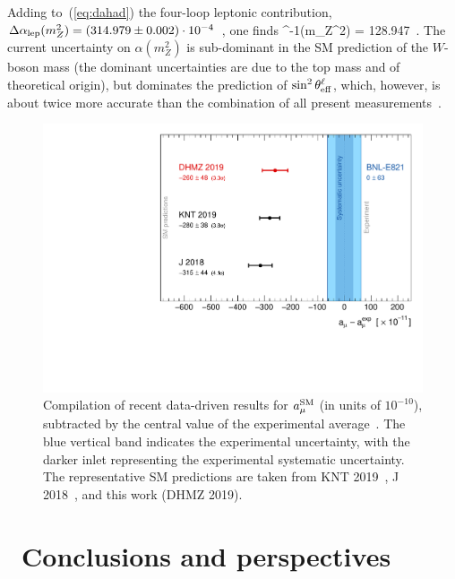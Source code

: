 Adding to~(\ref{eq:dahad}) the four-loop leptonic contribution, $\Delta\alpha_{\rm lep} (m_Z^2)=(314.979 \pm 0.002)\cdot 10^{-4}$~\cite{sturm}, 
one finds
\beq
   \alpha^{-1}(m_Z^2) = 128.947 \,.
\eeq
The current uncertainty on $ \alpha(m_Z^2)$ is sub-dominant in the SM prediction of the $W$-boson mass (the dominant uncertainties are due to the top mass and of theoretical origin), but dominates the prediction of $\sin^2\theta_{\rm eff}^\ell$, which, however, is about twice more accurate than the combination of all present measurements~\cite{gfitter}.

\begin{figure}[t]
\vspace{0.1cm}

\includegraphics[width=\columnwidth]{Figures/amures.pdf}
\vspace{-0.3cm}
\caption{ 
        Compilation of recent data-driven results for $a_\mu^{\rm SM}$ (in units of $10^{-10}$), subtracted by the central value of the experimental average~\cite{bnl,pdgg-2rev}.  The blue vertical band indicates the experimental uncertainty, with the darker inlet representing the experimental systematic uncertainty. The representative SM predictions are taken from KNT 2019~\cite{knt19}, J 2018~\cite{jeger},  and this work (DHMZ 2019). }
\label{fig:amures}
\end{figure}

\section{~Conclusions and perspectives}

